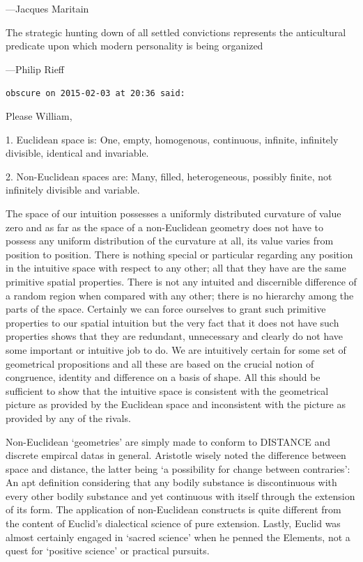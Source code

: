 \begin{footnotesize}
\begin{sffamily}
---Jacques Maritain

The strategic hunting down of all settled convictions represents the anticultural predicate upon which modern personality is being organized

---Philip Rieff

\hfill

\texttt{obscure on 2015-02-03 at 20:36 said:}

Please William,

1. Euclidean space is: One, empty, homogenous, continuous, infinite, infinitely divisible, identical and invariable.

2. Non-Euclidean spaces are: Many, filled, heterogeneous, possibly finite, not infinitely divisible and variable.

The space of our intuition possesses a uniformly distributed curvature of value zero and as far as the space of a non-Euclidean geometry does not have to possess any uniform distribution of the curvature at all, its value varies from position to position. There is nothing special or particular regarding any position in the intuitive space with respect to any other; all that they have are the same primitive spatial properties. There is not any intuited and discernible difference of a random region when compared with any other; there is no hierarchy among the parts of the space. Certainly we can force ourselves to grant such primitive properties to our spatial intuition but the very fact that it does not have such properties shows that they are redundant, unnecessary and clearly do not have some important or intuitive job to do. We are intuitively certain for some set of geometrical propositions and all these are based on the crucial notion of congruence, identity and difference on a basis of shape. All this should be sufficient to show that the intuitive space is consistent with the geometrical picture as provided by the Euclidean space and inconsistent with the picture as provided by any of the rivals.

Non-Euclidean `geometries' are simply made to conform to DISTANCE and discrete empircal datas in general. Aristotle wisely noted the difference between space and distance, the latter being `a possibility for change between contraries': An apt definition considering that any bodily substance is discontinuous with every other bodily substance and yet continuous with itself through the extension of its form. The application of non-Euclidean constructs is quite different from the content of Euclid's dialectical science of pure extension. Lastly, Euclid was almost certainly engaged in `sacred science' when he penned the Elements, not a quest for `positive science' or practical pursuits.


\hfill

\end{sffamily}
\end{footnotesize}

